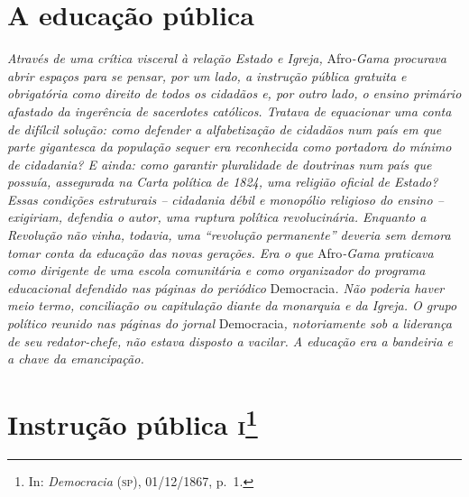 \chapter{A educação pública} %

\begin{didascalia}
\emph{Através de uma crítica visceral à relação Estado e Igreja,}
Afro\emph{-Gama procurava abrir espaços para se pensar, por um lado, a
instrução pública gratuita e obrigatória como direito de todos os
cidadãos e, por outro lado, o ensino primário afastado da ingerência de
sacerdotes católicos. Tratava de equacionar uma conta de difílcil
solução: como defender a alfabetização de cidadãos num país em que parte
gigantesca da população sequer era reconhecida como portadora do mínimo
de cidadania? E ainda: como garantir pluralidade de doutrinas num país
que possuía, assegurada na Carta política de 1824, uma religião oficial
de Estado? Essas condições estruturais -- cidadania débil e monopólio
religioso do ensino -- exigiriam, defendia o autor, uma ruptura política
revolucinária. Enquanto a Revolução não vinha, todavia, uma ``revolução
permanente'' deveria sem demora tomar conta da educação das novas
gerações. Era o que} Afro\emph{-Gama praticava como dirigente de uma
escola comunitária e como organizador do programa educacional defendido
nas páginas do periódico} Democracia\emph{. Não poderia haver meio
termo, conciliação ou capitulação diante da monarquia e da Igreja. O
grupo político reunido nas páginas do jornal} Democracia\emph{,
notoriamente sob a liderança de seu redator-chefe, não estava disposto a
vacilar. A educação era a bandeiria e a chave da emancipação.}
\end{didascalia}

\chapter{Instrução pública \textsc{i}\footnote{In: \emph{Democracia} (\textsc{sp}),
  01/12/1867, p.~1.}}

